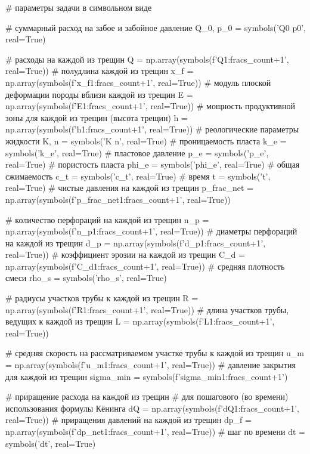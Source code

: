 \begin{pythoncode}
# параметры задачи в символьном виде

# суммарный расход на забое и забойное давление
Q_0, p_0 = symbols('Q0 p0', real=True)

# расходы на каждой из трещин
Q = np.array(symbols(f'Q1:{fracs_count+1}', real=True))
# полудлина каждой из трещин
x_f = np.array(symbols(f'x_f1:{fracs_count+1}', real=True))
# модуль плоской деформации породы вблизи каждой из трещин
E = np.array(symbols(f'E1:{fracs_count+1}', real=True))
# мощность продуктивной зоны для каждой из трещин (высота трещин)
h = np.array(symbols(f'h1:{fracs_count+1}', real=True))
# реологические параметры жидкости
K, n = symbols('K n', real=True)
# проницаемость пласта
k_e = symbols('k_e', real=True)
# пластовое давление
p_e = symbols('p_e', real=True)
# пористость пласта
phi_e = symbols('phi_e', real=True)
# общая сжимаемость
c_t = symbols('c_t', real=True)
# время
t = symbols('t', real=True)
# чистые давления на каждой из трещин
p_frac_net = np.array(symbols(f'p_frac_net1:{fracs_count+1}', real=True))

# количество перфораций на каждой из трещин
n_p = np.array(symbols(f'n_p1:{fracs_count+1}', real=True))
# диаметры перфораций на каждой из трещин
d_p = np.array(symbols(f'd_p1:{fracs_count+1}', real=True))
# коэффициент эрозии на каждой из трещин
C_d = np.array(symbols(f'C_d1:{fracs_count+1}', real=True))
# средняя плотность смеси
rho_s = symbols('rho_s', real=True)

# радиусы участков трубы к каждой из трещин
R = np.array(symbols(f'R1:{fracs_count+1}', real=True))
# длина участков трубы, ведущих к каждой из трещин
L = np.array(symbols(f'L1:{fracs_count+1}', real=True))

# средняя скорость на рассматриваемом участке трубы к каждой из трещин
u_m = np.array(symbols(f'u_m1:{fracs_count+1}', real=True))
# давление закрытия для каждой из трещин
sigma_min = symbols(f'sigma_min1:{fracs_count+1}')

# приращение расхода на каждой из трещин
# для пошагового (во времени) использования формулы Кёнинга
dQ = np.array(symbols(f'dQ1:{fracs_count+1}', real=True))
# приращения давлений на каждой из трещин
dp_f = np.array(symbols(f'dp_net1:{fracs_count+1}', real=True))
# шаг по времени
dt = symbols('dt', real=True)	
\end{pythoncode}


